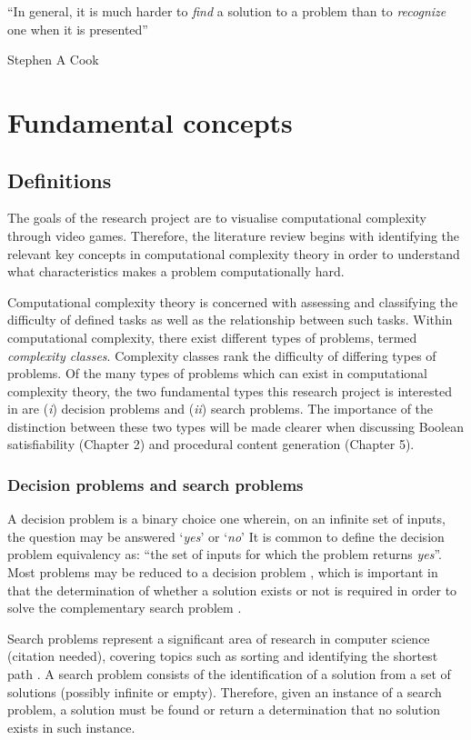 \documentclass[11pt, a4paper, oneside]{report} %
\begin{document}
\epigraph{``In general, it is much harder to \textit{find} a solution to a problem than to
\textit{recognize} one when it is presented''}{Stephen A Cook \cite{cook1984can}}

\section{Fundamental concepts}

\subsection{Definitions}

The goals of the research project are to visualise computational complexity through video games.
Therefore, the literature review begins with identifying the relevant key concepts in computational
complexity theory in order to understand what characteristics makes a problem computationally hard.

Computational complexity theory is concerned with assessing and classifying the difficulty of
defined tasks as well as the relationship between such tasks. Within computational complexity, there
exist different types of problems, termed \textit{complexity classes}. Complexity classes rank the
difficulty of differing types of problems. Of the many types of problems which can exist in
computational complexity theory, the two fundamental types this research project is interested in
are (\textit{i}) decision problems and (\textit{ii}) search problems. The importance of the
distinction between these two types will be made clearer when discussing Boolean satisfiability
(Chapter 2) and procedural content generation (Chapter 5).

\subsubsection{Decision problems and search problems}

A decision problem is a binary choice one wherein, on an infinite set of inputs, the question may be
answered `\textit{yes}' or `\textit{no}'  It is common  to define the decision problem equivalency
as: ``the set of inputs for which the problem returns \textit{yes}''. Most problems may be reduced
to a decision problem \cite{kendall2008survey}, which is important in that the determination of
whether a solution exists or not is required in order to solve the complementary search problem
\cite{Goldreich:2008}.

Search problems represent a significant area of research in computer science (citation needed),
covering topics such as sorting and identifying the shortest path \cite{Goldreich:2008}. A search
problem consists of the identification of a solution from a set of solutions (possibly infinite or
empty). Therefore, given an instance of a search problem, a solution must be found or return a
determination that no solution exists in such instance.
\end{document}
